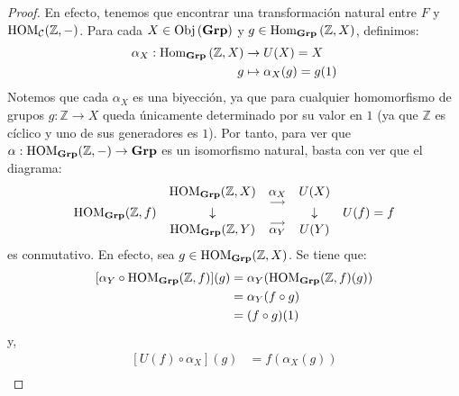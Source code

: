\documentclass[12pt]{report}
\theoremstyle{largebreak}
\newcommand\cf[3]{\ensuremath{#1:#2\rightarrow#3}}
\newcommand{\Obj}[1]{\ensuremath{\textup{Obj}\left(#1\right)}}
\newcommand{\Hom}[3]{\ensuremath{\textup{Hom}_{#1}\left(#2,#3\right)}}
\newcommand{\Cat}[1]{\ensuremath{\textup{\textbf{#1}}}}
\begin{document}
    \begin{proof}
        En efecto, tenemos que encontrar una transformación natural entre $F$ y $\textup{HOM}_{\mathcal{C}}(\mathbb{Z},-)$. Para cada $X\in\Obj{\Cat{Grp}}$ y $g\in\Hom{\Cat{Grp}}{\mathbb{Z}}{X}$, definimos:
        \begin{equation*}
            \begin{split}
                \alpha_X:\Hom{\Cat{Grp}}{\mathbb{Z}}{X}&\rightarrow U(X)=X\\
                g&\mapsto\alpha_X(g)=g(1)\\
            \end{split}
        \end{equation*}
        Notemos que cada $\alpha_X$ es una biyección, ya que para cualquier homomorfismo de grupos $\cf{g}{\mathbb{Z}}{X}$ queda únicamente determinado por su valor en $1$ (ya que $\mathbb{Z}$ es cíclico y uno de sus generadores es $1$). Por tanto, para ver que $\cf{\alpha}{\HOM{\Cat{Grp}}(\mathbb{Z},-)}{\Cat{Grp}}$ es un isomorfismo natural, basta con ver que el diagrama:
        \begin{equation*}
            \begin{array}{rcccl}
                & \HOM{\Cat{Grp}}(\mathbb{Z},X) & \underset{\longrightarrow}{\alpha_{X}} & U(X) &\\
                \HOM{\Cat{Grp}}(\mathbb{Z},f) & \downarrow & & \downarrow & U(f)=f \\
                & \HOM{\Cat{Grp}}(\mathbb{Z},Y) & \overset{\longrightarrow}{\alpha_{Y}} & U(Y) &\\
            \end{array}
        \end{equation*}
        es conmutativo. En efecto, sea $g\in\HOM{\Cat{Grp}}(\mathbb{Z},X)$. Se tiene que:
        \begin{equation*}
            \begin{split}
                [\alpha_Y\circ\HOM{\Cat{Grp}}(\mathbb{Z},f)](g)&=\alpha_Y(\HOM{\Cat{Grp}}(\mathbb{Z},f)(g))\\
                &=\alpha_Y(f\circ g)\\
                &=(f\circ g)(1)\\
            \end{split}
        \end{equation*}
        y,
        \begin{equation*}
            \begin{split}
                [U(f)\circ \alpha_X](g)&=f(\alpha_X(g))\\

\end{split}
\end{equation*}
\end{proof}
\end{document}
